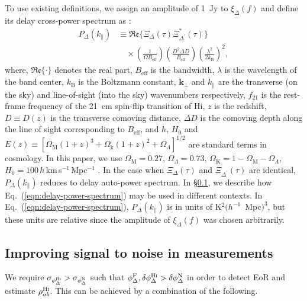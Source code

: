 \documentclass[
reprint,
superscriptaddress,
amsmath,
amssymb,
aps,
prd
]{revtex4-1}
\begin{document}
To use existing definitions, we assign an amplitude of 1~Jy to $\xi_\Delta(f)$ and define its delay cross-power spectrum as \cite{par12a,thy15a}:
\begin{align}
  P_\Delta(k_\parallel) &\equiv \mathfrak{Re}\bigg\{\Xi_\Delta(\tau)\Xi_{\Delta^\prime}^*(\tau)\bigg\} \nonumber\\
  &\quad \times \left(\frac{1}{\Omega B_\textrm{eff}}\right)\left(\frac{D^2\Delta D}{B_\textrm{eff}}\right)\left(\frac{\lambda^2}{2k_\textrm{B}}\right)^2, \label{eqn:delay-power-spectrum}
\end{align}
where, $\mathfrak{Re}\{\cdot\}$ denotes the real part, $B_\textrm{eff}$ is the bandwidth, $\lambda$ is the wavelength of the band center, $k_\textrm{B}$ is the Boltzmann constant, $\boldsymbol{k}_\perp$ and $k_\parallel$ are the transverse (on the sky) and line-of-sight (into the sky) wavenumbers respectively, $f_{21}$ is the rest-frame frequency of the 21~cm spin-flip transition of H{\sc i}, $z$ is the redshift, $D\equiv D(z)$ is the transverse comoving distance, $\Delta D$ is the comoving depth along the line of sight corresponding to $B_\textrm{eff}$, and $h$, $H_0$ and $E(z)\equiv [\Omega_\textrm{M}(1+z)^3+\Omega_\textrm{k}(1+z)^2+\Omega_\Lambda]^{1/2}$ are standard terms in cosmology. In this paper, we use $\Omega_\textrm{M}=0.27$, $\Omega_\Lambda=0.73$, $\Omega_\textrm{K}=1-\Omega_\textrm{M}-\Omega_\Lambda$, $H_0=100\,h\,$km$\,$s$^{-1}\,$Mpc$^{-1}$ \cite{wmap9cosmo}. In the case when $\Xi_\Delta(\tau)$ and $\Xi_{\Delta^\prime}(\tau)$ are identical, $P_\Delta(k_\parallel)$ reduces to delay auto-power spectrum. In \S\ref{sec:averaging}, we describe how Eq.~(\ref{eqn:delay-power-spectrum}) may be used in different contexts. In Eq.~(\ref{eqn:delay-power-spectrum}), $P_\Delta(k_\parallel)$ is in units of K$^2 (h^{-1}$~Mpc$)^3$, but these units are relative since the amplitude of $\xi_\Delta(f)$ was chosen arbitrarily. 

\subsection{Improving signal to noise in measurements}\label{sec:averaging}

We require $\sigma_{\phi_\Delta^\textrm{H{\sc i}}} > \sigma_{\phi_\Delta^\textrm{N}}$ such that $\phi_\Delta^\textrm{F}, \delta\phi_\Delta^\textrm{H{\sc i}} > \delta\phi_\Delta^\textrm{N}$ in order to detect EoR and estimate $\rho_{ab}^\textrm{H{\sc i}}$. This can be achieved by a combination of the following.
\end{document}
